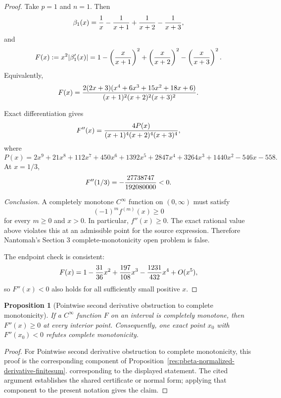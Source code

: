 \documentclass[11pt]{article}
\numberwithin{equation}{section}
\newtheorem{proposition}[theorem]{Proposition}
\theoremstyle{definition}
\theoremstyle{remark}
\newcommand{\1}{\mathbf 1}
\begin{document}
\begin{proof}
Take \(p=1\) and \(n=1\). Then
\[
\beta_1(x)={1\over x}-{1\over x+1}+{1\over x+2}-{1\over x+3},
\]
and
\[
F(x):=x^2|\beta_1'(x)|
=1-\left({x\over x+1}\right)^2
+\left({x\over x+2}\right)^2
-\left({x\over x+3}\right)^2.
\]
Equivalently,
\[
F(x)=
{2(2x+3)(x^4+6x^3+15x^2+18x+6)
\over (x+1)^2(x+2)^2(x+3)^2}.
\]

Exact differentiation gives
\[
F''(x)=
{4P(x)\over (x+1)^4(x+2)^4(x+3)^4},
\]
where
\[
P(x)=2x^9+21x^8+112x^7+450x^6+1392x^5+2847x^4
+3264x^3+1440x^2-546x-558.
\]
At \(x=1/3\),
\[
F''(1/3)=-{27738747\over 192080000}<0.
\]

\emph{Conclusion.}
A completely monotone \(C^\infty\) function on \((0,\infty)\) must satisfy
\[
(-1)^m f^{(m)}(x)\ge0
\]
for every \(m\ge0\) and \(x>0\). In particular, \(f''(x)\ge0\). The exact rational value above violates this at an admissible point for the source expression. Therefore Nantomah's Section 3 complete-monotonicity open problem is false.

The endpoint check is consistent:
\[
F(x)=1-{31\over36}x^2+{197\over108}x^3-{1231\over432}x^4+O(x^5),
\]
so \(F''(x)<0\) also holds for all sufficiently small positive \(x\).
\end{proof}

\begin{proposition}[Pointwise second derivative obstruction to complete monotonicity]
\label{res:cm-pointwise-secondderivative-obstruction}
If a \(C^\infty\) function \(F\) on an interval is completely monotone, then \(F''(x)\ge0\) at every interior point. Consequently, one exact point \(x_0\) with \(F''(x_0)<0\) refutes complete monotonicity.
\end{proposition}

\begin{proof}
For Pointwise second derivative obstruction to complete monotonicity, this proof is the corresponding component of Proposition~\ref{res:pbeta-normalized-derivative-finitesum}.  corresponding to the displayed statement.  The cited argument establishes the shared certificate or normal form; applying that component to the present notation gives the claim.
\end{proof}
\end{document}
